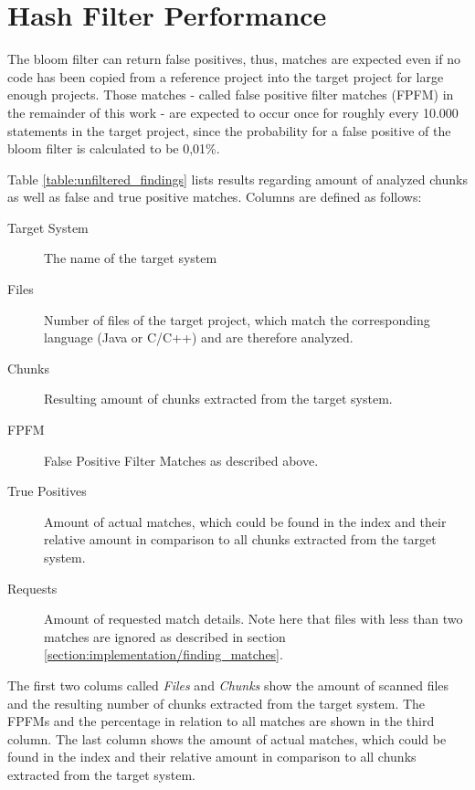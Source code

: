 \section{Hash Filter Performance}\label{section:evaluation/hash_filter_performance}
The bloom filter can return false positives, thus, matches are expected even if no code has been copied from a reference project into the target project for large enough projects.
Those matches - called false positive filter matches (FPFM) in the remainder of this work - are expected to occur once for roughly every 10.000 statements in the target project, since the probability for a false positive of the bloom filter is calculated to be 0,01\%. 

Table \autoref{table:unfiltered_findings} lists results regarding amount of analyzed chunks as well as false and true positive matches.
Columns are defined as follows:
\begin{description}
	\item[Target System] The name of the target system
	\item[Files] Number of files of the target project, which match the corresponding language (Java or C/C++) and are therefore analyzed.
	\item[Chunks] Resulting amount of chunks extracted from the target system.
	\item[FPFM] False Positive Filter Matches as described above.
	\item[True Positives] Amount of actual matches, which could be found in the index and their relative amount in comparison to all chunks extracted from the target system.
	\item[Requests] Amount of requested match details. Note here that files with less than two matches are ignored as described in section \ref{section:implementation/finding_matches}.
\end{description}
The first two colums called \textit{Files} and \textit{Chunks} show the amount of scanned files and the resulting number of chunks extracted from the target system.
The FPFMs and the percentage in relation to all matches are shown in the third column.
The last column shows the amount of actual matches, which could be found in the index and their relative amount in comparison to all chunks extracted from the target system.

